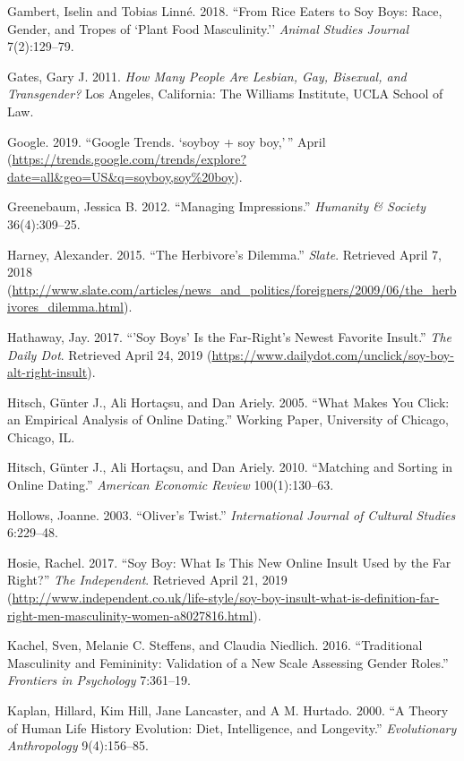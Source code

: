 \documentclass[twoside]{report}
\begin{document}
\hypertarget{gambert}{Gambert, Iselin and Tobias Linné. 2018. ``From Rice Eaters to Soy Boys:
Race, Gender, and Tropes of `Plant Food Masculinity.'' \emph{Animal
Studies Journal} 7(2):129--79.}

\hypertarget{gates}{Gates, Gary J. 2011. \emph{How Many People Are Lesbian, Gay, Bisexual,
and Transgender?} Los Angeles, California: The Williams Institute, UCLA
School of Law.}

\hypertarget{google}{Google. 2019. ``Google Trends. `soyboy + soy boy,'\,'' April
(\url{https://trends.google.com/trends/explore?date=all\&geo=US\&q=soyboy,soy\%20boy}).}

\hypertarget{greenebaum}{Greenebaum, Jessica B. 2012. ``Managing Impressions.'' \emph{Humanity \&
Society} 36(4):309--25.}

\hypertarget{harney}{Harney, Alexander. 2015. ``The Herbivore's Dilemma.'' \emph{Slate}.
Retrieved April 7, 2018
(\url{http://www.slate.com/articles/news_and_politics/foreigners/2009/06/the_herbivores_dilemma.html}).}

\hypertarget{hathaway}{Hathaway, Jay. 2017. ``'Soy Boys' Is the Far-Right's Newest Favorite
Insult.'' \emph{The Daily Dot}. Retrieved April 24, 2019
(\url{https://www.dailydot.com/unclick/soy-boy-alt-right-insult}).}

\hypertarget{hitsch1}{Hitsch, Günter J., Ali Hortaçsu, and Dan Ariely. 2005. ``What Makes You Click: an Empirical Analysis of Online Dating.'' Working Paper, University of Chicago, Chicago, IL.}

\hypertarget{hitsch2}{Hitsch, Günter J., Ali Hortaçsu, and Dan Ariely. 2010. ``Matching and
Sorting in Online Dating.'' \emph{American Economic Review}
100(1):130--63.}

\hypertarget{hollows}{Hollows, Joanne. 2003. ``Oliver's Twist.'' \emph{International Journal
of Cultural Studies} 6:229--48.}

\hypertarget{hosie}{Hosie, Rachel. 2017. ``Soy Boy: What Is This New Online Insult Used by
the Far Right?'' \emph{The Independent}. Retrieved April 21, 2019
(\url{http://www.independent.co.uk/life-style/soy-boy-insult-what-is-definition-far-right-men-masculinity-women-a8027816.html}).}

\hypertarget{kachel}{Kachel, Sven, Melanie C. Steffens, and Claudia Niedlich. 2016.
``Traditional Masculinity and Femininity: Validation of a New Scale
Assessing Gender Roles.'' \emph{Frontiers in Psychology} 7:361--19.}

\hypertarget{kaplan}{Kaplan, Hillard, Kim Hill, Jane Lancaster, and A M. Hurtado. 2000. ``A
Theory of Human Life History Evolution: Diet, Intelligence, and
Longevity.'' \emph{Evolutionary Anthropology} 9(4):156--85.}
\end{document}
